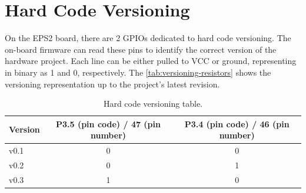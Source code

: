 \section{Hard Code Versioning}

On the EPS2 board, there are 2 GPIOs dedicated to hard code versioning.
The on-board firmware can read these pins to identify the correct version of the hardware project.
Each line can be either pulled to VCC or ground, representing in binary as 1 and 0, respectively.
The \autoref{tab:versioning-resistors} shows the versioning representation up to the project's latest revision.

\begin{table}[!h]
    \centering
    \begin{tabular}{lcc}
        \toprule[1.5pt]
        \textbf{Version}    &   \textbf{P3.5 (pin code) / 47 (pin number)}    &    \textbf{P3.4 (pin code) / 46 (pin number)}\\
        \midrule
        v0.1                & 0                 & 0              \\
        v0.2                & 0                 & 1              \\
        v0.3                & 1                 & 0              \\        
        \bottomrule[1.5pt]
    \end{tabular}
    \caption{Hard code versioning table.}
    \label{tab:versioning-resistors}
\end{table}
